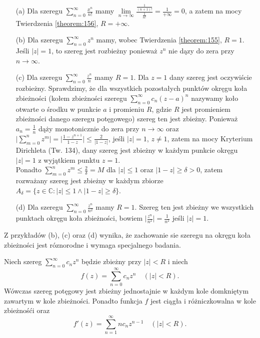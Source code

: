 \documentclass[leqno]{article}
\begin{document}
\begin{justify}
\begin{ex}
    \begin{itemize}
        \item [(a)] 
            Dla szeregu $\sum\limits_{n=0}^{\infty}\frac{x^n}{n!}$ mamy $\lim\limits_{n \to \infty} \frac{\frac{1}{(n+1)!}}{\frac{1}{n!}} = \frac{1}{+\infty} = 0$, 
            a zatem na mocy Twierdzenia \ref{theorem:156}, $R = + \infty$.
        \item [(b)] 
            Dla szeregu $\sum\limits_{n=0}^{\infty}z^n$ mamy, wobec Twierdzenia \ref{theorem:155}, $R = 1$. Jeśli $|z| = 1$, to szereg jest
            rozbieżny ponieważ $z^n$ nie dązy do zera przy $n \to \infty$.
        \item [(c)] 
            Dla szeregu $\sum\limits_{n=0}^{\infty}\frac{z^n}{n}$ mamy $R = 1$. Dla $z = 1$ dany szereg jest oczywiście rozbieżny.
            Sprawdzimy, że dla wszystkich pozostałych punktów okręgu koła zbieżności (kołem zbieżności szeregu $\sum\limits_{n=0}^{\infty}c_n{(z-a)}^n$
            nazywamy koło otwarte o środku w punkcie $a$ i promieniu $R$, gdzie $R$ jest promieniem zbieżności danego szeregu potęgowego) szereg ten jest zbieżny.
            Ponieważ $a_n = \frac{1}{n}$ dąży monotonicznie do zera przy $n \to \infty$ oraz $\Bigg| \sum\limits_{m=0}^{n}z^m \Bigg| = \Big| \frac{{1-z}^{n+1}}{1-z}\Big|
            \leqslant \frac{2}{|1-z|}$, jeśli $|z| = 1$, $z \neq 1$, zatem na mocy Kryterium Dirichleta (Tw. 134), dany szereg jest zbieżny w każdym punkcie
            okręgu $|z| = 1$ z wyjątkiem punktu $z = 1$. \\
            Ponadto $\sum\limits_{m=0}^{n}z^m \leqslant \frac{2}{\delta} = M$ dla $|z| \leqslant 1$ oraz $|1 - z| \geqslant \delta > 0$, zatem rozważany szereg
            jest zbieżny w każdym zbiorze $A_\delta = \{z \in \mathbb{C} : |z| \leqslant 1 \land |1 - z| \geqslant \delta\}$.
        \item [(d)]
            Dla szeregu $\sum\limits_{n=0}^{\infty}\frac{z^n}{n^2}$ mamy $R = 1$. Szereg ten jest zbieżny we wszystkich punktach okręgu koła zbieżności, bowiem
            $\Big|\frac{z^n}{n^2}\Big| = \frac{1}{n^2}$ jeśli $|z| = 1$.
    \end{itemize}
    
    Z przykładów (b), (c) oraz (d) wynika, że zachowanie sie szeregu na okręgu koła zbieżności jest róznorodne i wymaga specjalnego badania.
\end{ex}


\begin{theorem}
{
    Niech szereg $\sum\limits_{n=0}^{\infty}c_n z^n$ będzie zbieżny przy $|z| < R$ i niech
    \begin{equation}\label{eq:88}
        f(z) = \sum_{n=0}^{\infty}c_n z^n \quad (|z| < R).
    \end{equation}
    Wówczas szereg potęgowy jest zbieżny jednostajnie w każdym kole domkniętym zawartym w kole zbieżności. Ponadto 
    funkcja $f$ jest ciągła i różniczkowalna w kole zbieżnośći oraz
    \begin{equation}\label{eq:89}
        f'(z) = \sum_{n=1}^{\infty}n c_n z^{n-1} \quad (|z| < R).
    \end{equation}
}


\end{theorem}
\end{justify}
\end{document}

